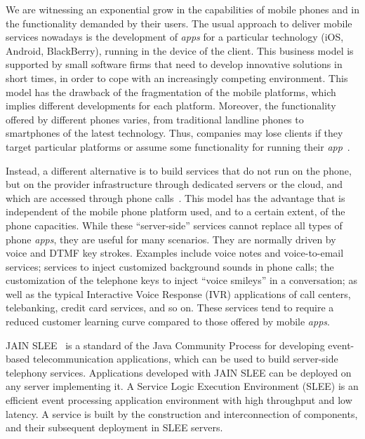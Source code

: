 We are witnessing an exponential grow in the capabilities of mobile phones and in the functionality demanded by 
their users. The usual approach to deliver mobile services nowadays is the development of {\em apps} 
for a particular technology (iOS, Android, BlackBerry), running in the device of the client. This business model is 
supported by small software firms that need to develop innovative solutions in short times, in order to cope with 
an increasingly competing environment. This model has the drawback of the fragmentation of the mobile platforms, 
which implies different developments for each platform. Moreover, the functionality offered by different phones varies, 
from traditional landline phones to smartphones of the latest technology. Thus, companies may lose clients if they 
target particular platforms or assume some functionality for running their {\em app}~\cite{5640901}. 

Instead, a different alternative is to build services that do not run on the phone, but on the provider infrastructure
through dedicated servers or the cloud, and which are accessed through phone calls~\cite{Almira}. This model has the 
advantage that is independent of the mobile phone platform used, and to a certain extent, of the phone capacities. While 
these ``server-side'' services cannot replace all types of phone {\em apps}, they are useful for many scenarios. They
are normally driven by voice and DTMF key strokes. Examples include voice notes and voice-to-email services; 
services to inject customized background sounds in phone calls; the customization of the telephone keys to inject 
``voice smileys'' in a conversation; as well as the typical Interactive Voice Response (IVR) applications of call 
centers, telebanking, credit card services, and so on. These services tend to require a reduced customer learning curve
compared to those offered by mobile {\em apps}.

JAIN SLEE~\cite{JAINSLEE} is a standard of the Java Community Process for developing event-based 
telecommunication applications, which can be used to build server-side telephony services. Applications 
developed with JAIN SLEE can be deployed on any server implementing it. A Service Logic Execution 
Environment (SLEE) is an efficient event processing application environment with high throughput and 
low latency. A service is built by the construction and interconnection of components, and their subsequent
deployment in SLEE servers.

